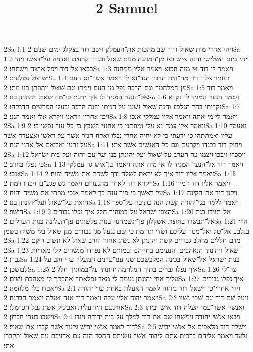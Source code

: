 

\title{2 Samuel}

2Sa 1:1  ויהי אחרי מות שׁאול ודוד שׁב מהכות את־העמלק וישׁב דוד בצקלג ימים שׁנים׃
2Sa 1:2  ויהי ביום השׁלישׁי והנה אישׁ בא מן־המחנה מעם שׁאול ובגדיו קרעים ואדמה על־ראשׁו ויהי בבאו אל־דוד ויפל ארצה וישׁתחו׃
2Sa 1:3  ויאמר לו דוד אי מזה תבוא ויאמר אליו ממחנה ישׂראל נמלטתי׃
2Sa 1:4  ויאמר אליו דוד מה־היה הדבר הגד־נא לי ויאמר אשׁר־נס העם מן־המלחמה וגם־הרבה נפל מן־העם וימתו וגם שׁאול ויהונתן בנו מתו׃
2Sa 1:5  ויאמר דוד אל־הנער המגיד לו איך ידעת כי־מת שׁאול ויהונתן בנו׃
2Sa 1:6  ויאמר הנער המגיד לו נקרא נקריתי בהר הגלבע והנה שׁאול נשׁען על־חניתו והנה הרכב ובעלי הפרשׁים הדבקהו׃
2Sa 1:7  ויפן אחריו ויראני ויקרא אלי ואמר הנני׃
2Sa 1:8  ויאמר לי מי־אתה ויאמר אליו עמלקי אנכי׃
2Sa 1:9  ויאמר אלי עמד־נא עלי ומתתני כי אחזני השׁבץ כי־כל־עוד נפשׁי בי׃
2Sa 1:10  ואעמד עליו ואמתתהו כי ידעתי כי לא יחיה אחרי נפלו ואקח הנזר אשׁר על־ראשׁו ואצעדה אשׁר על־זרעו ואביאם אל־אדני הנה׃
2Sa 1:11  ויחזק דוד בבגדו ויקרעם וגם כל־האנשׁים אשׁר אתו׃
2Sa 1:12  ויספדו ויבכו ויצמו עד־הערב על־שׁאול ועל־יהונתן בנו ועל־עם יהוה ועל־בית ישׂראל כי נפלו בחרב׃
2Sa 1:13  ויאמר דוד אל־הנער המגיד לו אי מזה אתה ויאמר בן־אישׁ גר עמלקי אנכי׃
2Sa 1:14  ויאמר אליו דוד איך לא יראת לשׁלח ידך לשׁחת את־משׁיח יהוה׃
2Sa 1:15  ויקרא דוד לאחד מהנערים ויאמר גשׁ פגע־בו ויכהו וימת׃
2Sa 1:16  ויאמר אליו דוד דמיך על־ראשׁך כי פיך ענה בך לאמר אנכי מתתי את־משׁיח יהוה׃
2Sa 1:17  ויקנן דוד את־הקינה הזאת על־שׁאול ועל־יהונתן בנו׃
2Sa 1:18  ויאמר ללמד בני־יהודה קשׁת הנה כתובה על־ספר הישׁר׃
2Sa 1:19  הצבי ישׂראל על־במותיך חלל איך נפלו גבורים׃
2Sa 1:20  אל־תגידו בגת אל־תבשׂרו בחוצת אשׁקלון פן־תשׂמחנה בנות פלשׁתים פן־תעלזנה בנות הערלים׃
2Sa 1:21  הרי בגלבע אל־טל ואל־מטר עליכם ושׂדי תרומת כי שׁם נגעל מגן גבורים מגן שׁאול בלי משׁיח בשׁמן׃
2Sa 1:22  מדם חללים מחלב גבורים קשׁת יהונתן לא נשׂוג אחור וחרב שׁאול לא תשׁוב ריקם׃
2Sa 1:23  שׁאול ויהונתן הנאהבים והנעימם בחייהם ובמותם לא נפרדו מנשׁרים קלו מאריות גברו׃
2Sa 1:24  בנות ישׂראל אל־שׁאול בכינה המלבשׁכם שׁני עם־עדנים המעלה עדי זהב על לבושׁכן׃
2Sa 1:25  איך נפלו גברים בתוך המלחמה יהונתן על־במותיך חלל׃
2Sa 1:26  צר־לי עליך אחי יהונתן נעמת לי מאד נפלאתה אהבתך לי מאהבת נשׁים׃
2Sa 1:27  איך נפלו גבורים ויאבדו כלי מלחמה׃
2Sa 2:1  ויהי אחרי־כן וישׁאל דוד ביהוה לאמר האעלה באחת ערי יהודה ויאמר יהוה אליו עלה ויאמר דוד אנה אעלה ויאמר חברנה׃
2Sa 2:2  ויעל שׁם דוד וגם שׁתי נשׁיו אחינעם היזרעלית ואביגיל אשׁת נבל הכרמלי׃
2Sa 2:3  ואנשׁיו אשׁר־עמו העלה דוד אישׁ וביתו וישׁבו בערי חברון׃
2Sa 2:4  ויבאו אנשׁי יהודה וימשׁחו־שׁם את־דוד למלך על־בית יהודה ויגדו לדוד לאמר אנשׁי יבישׁ גלעד אשׁר קברו את־שׁאול׃
2Sa 2:5  וישׁלח דוד מלאכים אל־אנשׁי יבישׁ גלעד ויאמר אליהם ברכים אתם ליהוה אשׁר עשׂיתם החסד הזה עם־אדניכם עם־שׁאול ותקברו אתו׃
